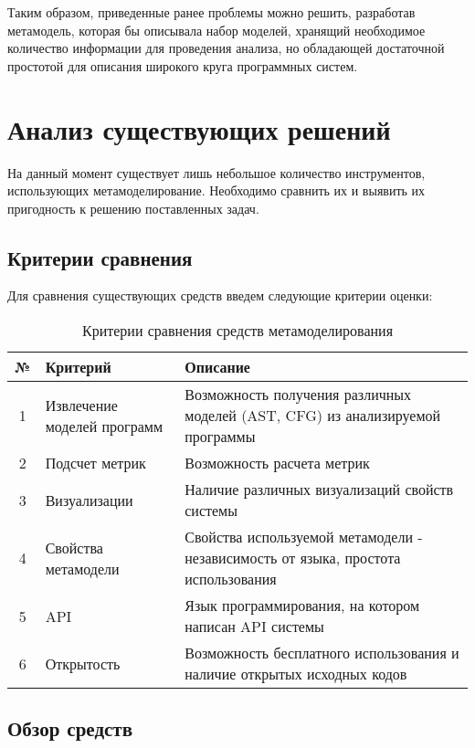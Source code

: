 Таким образом, приведенные ранее проблемы можно решить, разработав метамодель,
которая бы описывала набор моделей, хранящий необходимое количество информации
для проведения анализа, но обладающей достаточной простотой для описания
широкого круга программных систем.

\section{Анализ существующих решений}
\label{sec:analysis}

На данный момент существует лишь небольшое количество инструментов, использующих
метамоделирование. Необходимо сравнить их и выявить их пригодность к решению
поставленных задач.

\subsection{Критерии сравнения}
\label{subsec:criterions}

Для сравнения существующих средств введем следующие критерии оценки:

\begin{table}[ht]
\begin{tabularx}{\textwidth}{|c|X|X|}
\hline
№ & Критерий & Описание \\ \hline
1 & Извлечение моделей программ & Возможность получения различных моделей (AST, CFG) из анализируемой программы \\ \hline
2 & Подсчет метрик & Возможность расчета метрик \\ \hline
3 & Визуализации & Наличие различных визуализаций свойств системы \\ \hline
4 & Свойства метамодели & Свойства используемой метамодели - независимость от языка, простота использования \\ \hline
5 & API & Язык программирования, на котором написан API системы \\ \hline
6 & Открытость & Возможность бесплатного использования и наличие открытых исходных кодов \\ \hline
\end{tabularx}
\caption{Критерии сравнения средств метамоделирования}
\end{table}

\subsection{Обзор средств}
